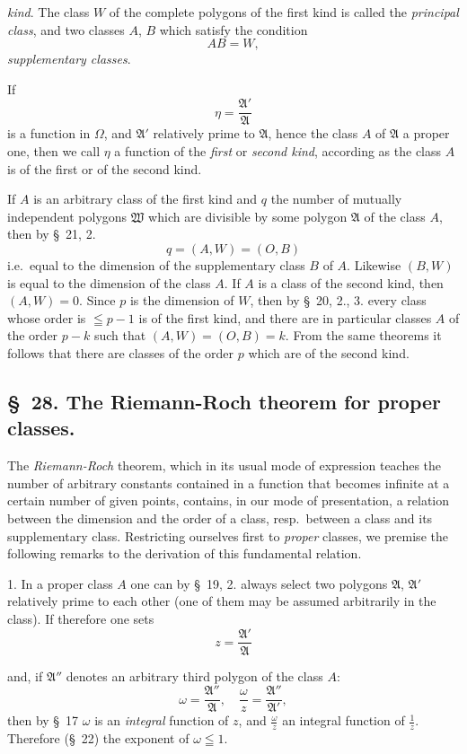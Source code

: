 \documentclass{article}
\begin{document}
\emph{kind}. The class $W$ of the complete polygons of the first kind is called the \emph{principal class}, and two classes $A$, $B$ which satisfy the condition
\[ AB = W, \]
\emph{supplementary classes}.

If
\[ \eta = \frac{\mathfrak{A}'}{\mathfrak{A}} \]
is a function in $\Omega$, and $\mathfrak{A}'$ relatively prime to $\mathfrak{A}$, hence the class $A$ of $\mathfrak{A}$ a proper one, then we call $\eta$ a function of the \emph{first} or \emph{second kind}, according as the class $A$ is of the first or of the second kind.

If $A$ is an arbitrary class of the first kind and $q$ the number of mutually independent polygons $\mathfrak{W}$ which are divisible by some polygon $\mathfrak{A}$ of the class $A$, then by §~21, 2.
\[ q = (A, W) = (O, B) \]
i.e.\ equal to the dimension of the supplementary class $B$ of $A$. Likewise $(B, W)$ is equal to the dimension of the class $A$. If $A$ is a class of the second kind, then $(A, W) = 0$. Since $p$ is the dimension of $W$, then by §~20, 2., 3. every class whose order is $\leqq p-1$ is of the first kind, and there are in particular classes $A$ of the order $p-k$ such that $(A, W) = (O, B) = k$. From the same theorems it follows that there are classes of the order $p$ which are of the second kind.

\subsection*{§~28. The Riemann-Roch theorem for proper classes.}

The \emph{Riemann-Roch} theorem, which in its usual mode of expression teaches the number of arbitrary constants contained in a function that becomes infinite at a certain number of given points, contains, in our mode of presentation, a relation between the dimension and the order of a class, resp.\ between a class and its supplementary class. Restricting ourselves first to \emph{proper} classes, we premise the following remarks to the derivation of this fundamental relation.

1. In a proper class $A$ one can by §~19, 2. always select two polygons $\mathfrak{A}$, $\mathfrak{A}'$ relatively prime to each other (one of them may be assumed arbitrarily in the class). If therefore one sets
\[ z = \frac{\mathfrak{A}'}{\mathfrak{A}} \]

and, if $\mathfrak{A}''$ denotes an arbitrary third polygon of the class $A$:
\[ \omega = \frac{\mathfrak{A}''}{\mathfrak{A}}, \quad \frac{\omega}{z} = \frac{\mathfrak{A}''}{\mathfrak{A}'}, \]
then by §~17 $\omega$ is an \emph{integral} function of $z$, and $\frac{\omega}{z}$ an integral function of $\frac{1}{z}$. Therefore (§~22) the exponent of $\omega \leqq 1$.
\end{document}
